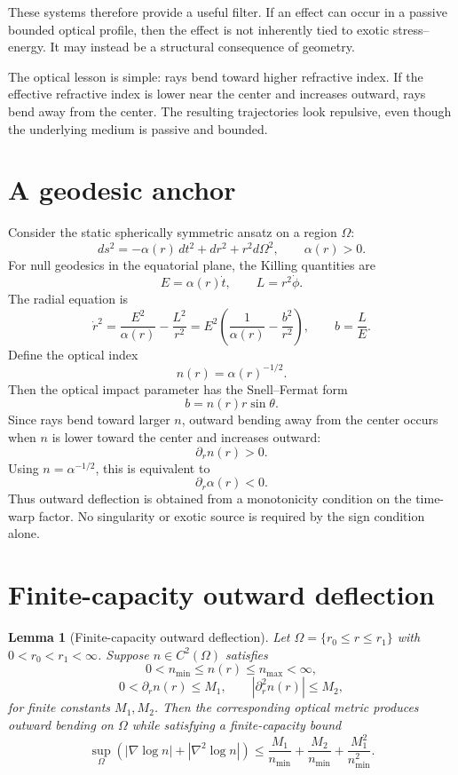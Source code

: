 \documentclass[11pt]{article}
\newtheorem{lemma}{Lemma}
\begin{document}
These systems therefore provide a useful filter.  If an effect can occur in a passive bounded optical profile, then the effect is not inherently tied to exotic stress--energy.  It may instead be a structural consequence of geometry.

The optical lesson is simple: rays bend toward higher refractive index.  If the effective refractive index is lower near the center and increases outward, rays bend away from the center.  The resulting trajectories look repulsive, even though the underlying medium is passive and bounded.

\section{A geodesic anchor}

Consider the static spherically symmetric ansatz on a region $\Omega$:
\[
        ds^2=-\alpha(r)\,dt^2+dr^2+r^2d\Omega^2,
        \qquad \alpha(r)>0.
\]
For null geodesics in the equatorial plane, the Killing quantities are
\[
        E=\alpha(r)\dot t,
        \qquad
        L=r^2\dot\phi.
\]
The radial equation is
\[
        \dot r^2
        =
        \frac{E^2}{\alpha(r)}
        -
        \frac{L^2}{r^2}
        =
        E^2\left(
        \frac{1}{\alpha(r)}
        -
        \frac{b^2}{r^2}
        \right),
        \qquad b=\frac{L}{E}.
\]
Define the optical index
\[
        n(r)=\alpha(r)^{-1/2}.
\]
Then the optical impact parameter has the Snell--Fermat form
\[
        b=n(r)r\sin\theta.
\]
Since rays bend toward larger $n$, outward bending away from the center occurs when $n$ is lower toward the center and increases outward:
\[
        \partial_r n(r)>0.
\]
Using $n=\alpha^{-1/2}$, this is equivalent to
\[
        \partial_r \alpha(r)<0.
\]
Thus outward deflection is obtained from a monotonicity condition on the time-warp factor.  No singularity or exotic source is required by the sign condition alone.

\section{Finite-capacity outward deflection}

\begin{lemma}[Finite-capacity outward deflection]
Let $\Omega=\{r_0\le r\le r_1\}$ with $0<r_0<r_1<\infty$.  Suppose $n\in C^2(\Omega)$ satisfies
\[
        0<n_{\min}\le n(r)\le n_{\max}<\infty,
\]
\[
        0<\partial_r n(r)\le M_1,
        \qquad
        |\partial_r^2 n(r)|\le M_2,
\]
for finite constants $M_1,M_2$.  Then the corresponding optical metric produces outward bending on $\Omega$ while satisfying a finite-capacity bound
\[
        \sup_{\Omega}
        \left(
        |\nabla\log n|+|\nabla^2\log n|
        \right)
        \le
        \frac{M_1}{n_{\min}}
        +
        \frac{M_2}{n_{\min}}
        +
        \frac{M_1^2}{n_{\min}^2}.
\]
\end{lemma}
\end{document}
